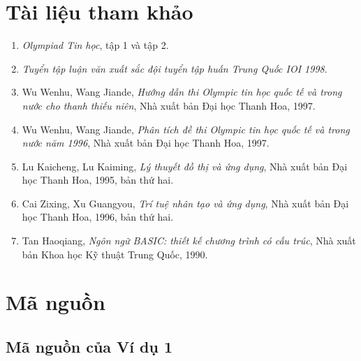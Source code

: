 \documentclass[11pt]{article}
\begin{document}
\section{Tài liệu tham khảo}

\begin{enumerate}
  \item \textit{Olympiad Tin học}, tập 1 và tập 2.
  \item \textit{Tuyển tập luận văn xuất sắc đội tuyển tập huấn Trung Quốc
  IOI 1998}.
  \item Wu Wenhu, Wang Jiande, \textit{Hướng dẫn thi Olympic tin học quốc tế
  và trong nước cho thanh thiếu niên}, Nhà xuất bản Đại học Thanh Hoa, 1997.
  \item Wu Wenhu, Wang Jiande, \textit{Phân tích đề thi Olympic tin học quốc
  tế và trong nước năm 1996}, Nhà xuất bản Đại học Thanh Hoa, 1997.
  \item Lu Kaicheng, Lu Kaiming, \textit{Lý thuyết đồ thị và ứng dụng}, Nhà
  xuất bản Đại học Thanh Hoa, 1995, bản thứ hai.
  \item Cai Zixing, Xu Guangyou, \textit{Trí tuệ nhân tạo và ứng dụng}, Nhà
  xuất bản Đại học Thanh Hoa, 1996, bản thứ hai.
  \item Tan Haoqiang, \textit{Ngôn ngữ BASIC: thiết kế chương trình có cấu
  trúc}, Nhà xuất bản Khoa học Kỹ thuật Trung Quốc, 1990.
\end{enumerate}

\section{Mã nguồn}

\subsection{Mã nguồn của Ví dụ 1}
\end{document}
